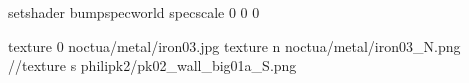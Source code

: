 setshader bumpspecworld
specscale 0 0 0

texture 0 noctua/metal/iron03.jpg
texture n noctua/metal/iron03_N.png
//texture s philipk2/pk02_wall_big01a_S.png
